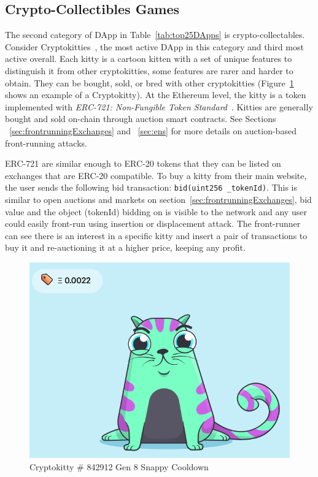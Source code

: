 
\subsection{Crypto-Collectibles Games}\label{sec:cryptogames}

The second category of DApp in Table~\ref{tab:top25DApps} is crypto-collectables. Consider Cryptokitties~\cite{cryptokitties}, the most active DApp in this category and third most active overall. Each kitty is a cartoon kitten with a set of unique features to distinguish it from other cryptokitties, some features are rarer and harder to obtain. They can be bought, sold, or bred with other cryptokitties (Figure~\ref{fig:cryptokittie} shows an example of a Cryptokitty). At the Ethereum level, the kitty is a token implemented with \textit{ERC-721: Non-Fungible Token Standard}~\cite{erc721}. Kitties are generally bought and sold on-chain through auction smart contracts. See Sections ~\ref{sec:frontrunningExchanges} and ~\ref{sec:ens} for more details on auction-based front-running attacks.

ERC-721 are similar enough to ERC-20 tokens that they can be listed on exchanges that are ERC-20 compatible. To buy a kitty from their main website, the user sends the following bid transaction: \texttt{bid(uint256 \_tokenId)}. This is similar to open auctions and markets on section~\ref{sec:frontrunningExchanges}, bid value and the object (tokenId) bidding on is visible to the network and any user could easily front-run using insertion or displacement attack. The front-runner can see there is an interest in a specific kitty and insert a pair of transactions to buy it and re-auctioning it at a higher price, keeping any profit. %

\begin{figure}[t]
    \centering
    \includegraphics[width=0.5\linewidth]{figures/cryptokittie842912.png}
    \caption{Cryptokitty \# 842912 \textemdash Gen 8 \textemdash Snappy Cooldown}
    \label{fig:cryptokittie}
\end{figure}
    

